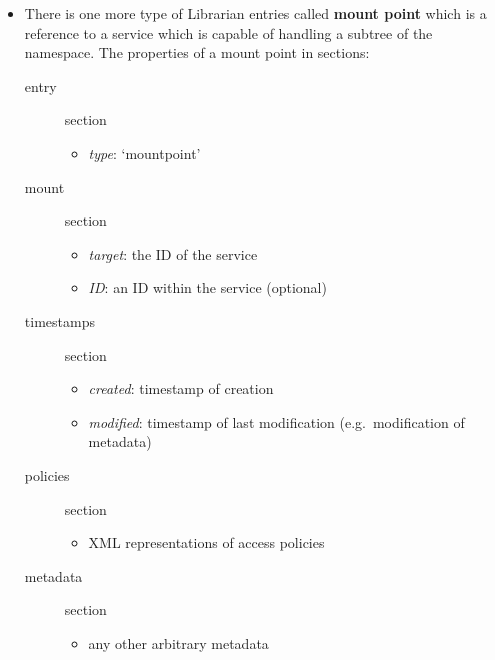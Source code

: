 \documentclass{book}
\begin{document}
\begin{itemize}
    \item There is one more type of Librarian entries called \textbf{mount point} which is a reference to a service which is capable of handling a subtree of the namespace. The properties of a mount point in sections:
    \begin{description}
        \item [entry] section 
        \begin{itemize}
            \item \emph{type}: `mountpoint' 
        \end{itemize}
        \item [mount] section 
        \begin{itemize}
            \item \emph{target}: the ID of the service
            \item \emph{ID}: an ID within the service (optional)
        \end{itemize}
        \item [timestamps] section 
        \begin{itemize}
            \item \emph{created}: timestamp of creation 
            \item \emph{modified}: timestamp of last modification (e.g.~modification of metadata)
        \end{itemize}
        \item [policies] section 
        \begin{itemize}
            \item XML representations of access policies 
        \end{itemize}
        \item [metadata] section 
        \begin{itemize}
            \item any other arbitrary metadata 
        \end{itemize}
    \end{description}


\end{itemize}
\end{document}
